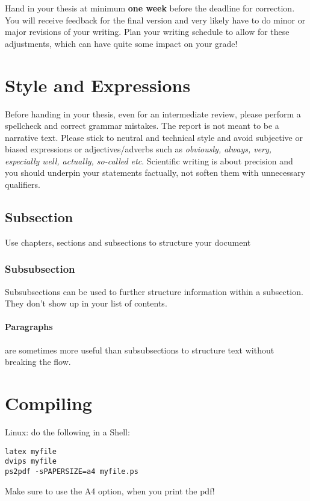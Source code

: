\documentclass[a4paper,twoside, openright,12pt]{report}
\begin{document}
Hand in your thesis at minimum \textbf{one week} before the deadline for correction. You will receive feedback for the final version and very likely have to do minor or major revisions of your writing. Plan your writing schedule to allow for these adjustments, which can have quite some impact on your grade! 

\section{Style and Expressions}

Before handing in your thesis, even for an intermediate review, please perform a spellcheck and correct grammar mistakes. The report is not meant to be a narrative text. Please stick to neutral and technical style and avoid subjective or biased expressions or adjectives/adverbs such as \emph{obviously, always, very, especially well, actually, so-called etc}. Scientific writing is about precision and you should underpin your statements factually, not soften them with unnecessary qualifiers.

\subsection{Subsection}

Use chapters, sections and subsections to structure your document

\subsubsection{Subsubsection}

Subsubsections can be used to further structure information within a subsection. They don't show up in your list of contents.

\paragraph{Paragraphs} are sometimes more useful than subsubsections to structure text without breaking the flow.

\section{Compiling}
Linux: 
do the following in a Shell:\\
\begin{verbatim}
latex myfile
dvips myfile
ps2pdf -sPAPERSIZE=a4 myfile.ps
\end{verbatim}
Make sure to use the A4 option, when you print the pdf!
\end{document}

